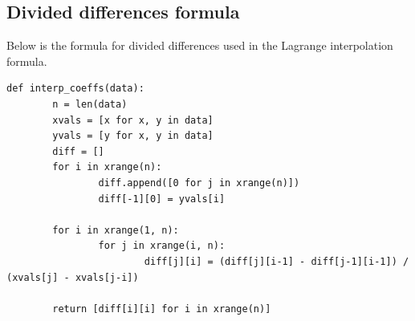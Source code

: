 \documentclass[onecolumn, draftclsnofoot,10pt, compsoc]{IEEEtran}
\begin{document}
\subsection{Divided differences formula}
Below is the formula for divided differences used in the Lagrange interpolation formula.

\begin{lstlisting}
def interp_coeffs(data):
        n = len(data)
        xvals = [x for x, y in data]
        yvals = [y for x, y in data]
        diff = []
        for i in xrange(n):
                diff.append([0 for j in xrange(n)])
                diff[-1][0] = yvals[i]

        for i in xrange(1, n):
                for j in xrange(i, n):
                        diff[j][i] = (diff[j][i-1] - diff[j-1][i-1]) / (xvals[j] - xvals[j-i])

        return [diff[i][i] for i in xrange(n)]

\end{lstlisting}



\end{document}
